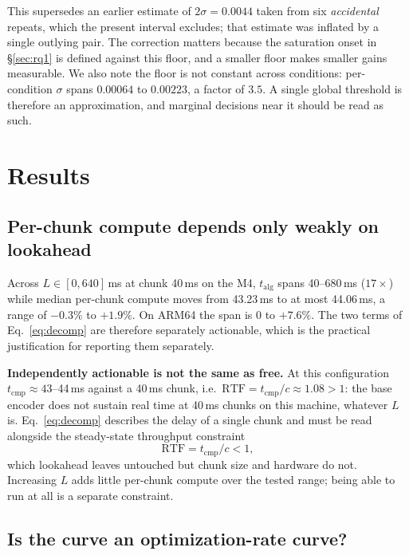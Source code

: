 \documentclass[journal]{IEEEtran}
\newcommand{\talg}{\ensuremath{t_{\mathrm{alg}}}}
\newcommand{\tcmp}{\ensuremath{t_{\mathrm{cmp}}}}
\begin{document}
This supersedes an earlier estimate of $2\sigma=0.0044$ taken from six
\emph{accidental} repeats, which the present interval excludes; that estimate
was inflated by a single outlying pair. The correction matters because the
saturation onset in \S\ref{sec:rq1} is defined against this floor, and a
smaller floor makes smaller gains measurable. We also note the floor is not
constant across conditions: per-condition $\sigma$ spans $0.00064$ to
$0.00223$, a factor of $3.5$. A single global threshold is therefore an
approximation, and marginal decisions near it should be read as such.

\section{Results}

\subsection{Per-chunk compute depends only weakly on lookahead}
\label{sec:compute}

Across $L\in[0,640]$\,ms at chunk 40\,ms on the M4, \talg{} spans 40--680\,ms
($17\times$) while median per-chunk compute moves from 43.23\,ms to at most
44.06\,ms, a range of $-0.3\%$ to $+1.9\%$. On ARM64 the span is $0$ to
$+7.6\%$. The two terms of Eq.~\ref{eq:decomp} are therefore separately
actionable, which is the practical justification for reporting them
separately.

\textbf{Independently actionable is not the same as free.} At this
configuration $\tcmp{}\approx43$--44\,ms against a 40\,ms chunk, i.e.\
$\mathrm{RTF}=\tcmp/c\approx1.08>1$: the base encoder does not sustain real
time at 40\,ms chunks on this machine, whatever $L$ is. Eq.~\ref{eq:decomp}
describes the delay of a single chunk and must be read alongside the
steady-state throughput constraint
\begin{equation}
\mathrm{RTF} = \tcmp / c < 1,
\label{eq:rtf}
\end{equation}
which lookahead leaves untouched but chunk size and hardware do not. Increasing $L$ adds little per-chunk compute over the tested range;
being able to run at all is a separate constraint.

\subsection{Is the curve an optimization-rate curve?}
\label{sec:convergence}
\end{document}
